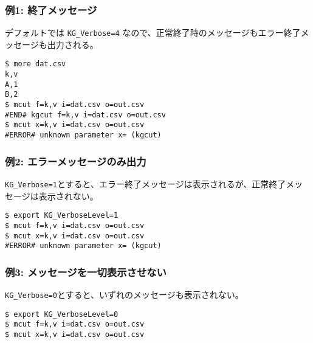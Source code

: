 \subsubsection*{例1: 終了メッセージ}

デフォルトでは \verb|KG_Verbose=4| なので、正常終了時のメッセージもエラー終了メッセージも出力される。


\begin{Verbatim}[baselinestretch=0.7,frame=single]
$ more dat.csv
k,v
A,1
B,2
$ mcut f=k,v i=dat.csv o=out.csv
#END# kgcut f=k,v i=dat.csv o=out.csv
$ mcut x=k,v i=dat.csv o=out.csv
#ERROR# unknown parameter x= (kgcut)
\end{Verbatim}
\subsubsection*{例2: エラーメッセージのみ出力}

\verb|KG_Verbose=1|とすると、エラー終了メッセージは表示されるが、正常終了メッセージは表示されない。


\begin{Verbatim}[baselinestretch=0.7,frame=single]
$ export KG_VerboseLevel=1
$ mcut f=k,v i=dat.csv o=out.csv
$ mcut x=k,v i=dat.csv o=out.csv
#ERROR# unknown parameter x= (kgcut)
\end{Verbatim}
\subsubsection*{例3: メッセージを一切表示させない}

\verb|KG_Verbose=0|とすると、いずれのメッセージも表示されない。


\begin{Verbatim}[baselinestretch=0.7,frame=single]
$ export KG_VerboseLevel=0
$ mcut f=k,v i=dat.csv o=out.csv
$ mcut x=k,v i=dat.csv o=out.csv
\end{Verbatim}
